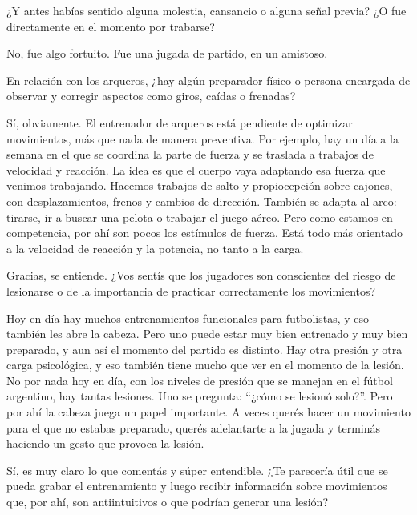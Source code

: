 \begin{description}[leftmargin=0pt, itemindent=\parindent, labelsep=0.5em, itemsep=0pt, parsep=0pt, topsep=0pt]
    \item[\textbf{Entrevistador:}] ¿Y antes habías sentido alguna molestia, cansancio o alguna señal previa? ¿O fue directamente en el momento por trabarse?

    \item[\textbf{Sebastián López:}] No, fue algo fortuito. Fue una jugada de partido, en un amistoso.

    \item[\textbf{Entrevistador:}] En relación con los arqueros, ¿hay algún preparador físico o persona encargada de observar y corregir aspectos como giros, caídas o frenadas?

    \item[\textbf{Sebastián López:}] Sí, obviamente. El entrenador de arqueros está pendiente de optimizar movimientos, más que nada de manera preventiva. Por ejemplo, hay un día a la semana en el que se coordina la parte de fuerza y se traslada a trabajos de velocidad y reacción. La idea es que el cuerpo vaya adaptando esa fuerza que venimos trabajando. Hacemos trabajos de salto y propiocepción sobre cajones, con desplazamientos, frenos y cambios de dirección. También se adapta al arco: tirarse, ir a buscar una pelota o trabajar el juego aéreo. Pero como estamos en competencia, por ahí son pocos los estímulos de fuerza. Está todo más orientado a la velocidad de reacción y la potencia, no tanto a la carga.

    \item[\textbf{Entrevistador:}] Gracias, se entiende. ¿Vos sentís que los jugadores son conscientes del riesgo de lesionarse o de la importancia de practicar correctamente los movimientos?

    \item[\textbf{Sebastián López:}] Hoy en día hay muchos entrenamientos funcionales para futbolistas, y eso también les abre la cabeza. Pero uno puede estar muy bien entrenado y muy bien preparado, y aun así el momento del partido es distinto. Hay otra presión y otra carga psicológica, y eso también tiene mucho que ver en el momento de la lesión. No por nada hoy en día, con los niveles de presión que se manejan en el fútbol argentino, hay tantas lesiones. Uno se pregunta: ``¿cómo se lesionó solo?''. Pero por ahí la cabeza juega un papel importante. A veces querés hacer un movimiento para el que no estabas preparado, querés adelantarte a la jugada y terminás haciendo un gesto que provoca la lesión.

    \item[\textbf{Entrevistador:}] Sí, es muy claro lo que comentás y súper entendible. ¿Te parecería útil que se pueda grabar el entrenamiento y luego recibir información sobre movimientos que, por ahí, son antiintuitivos o que podrían generar una lesión?


\end{description}
